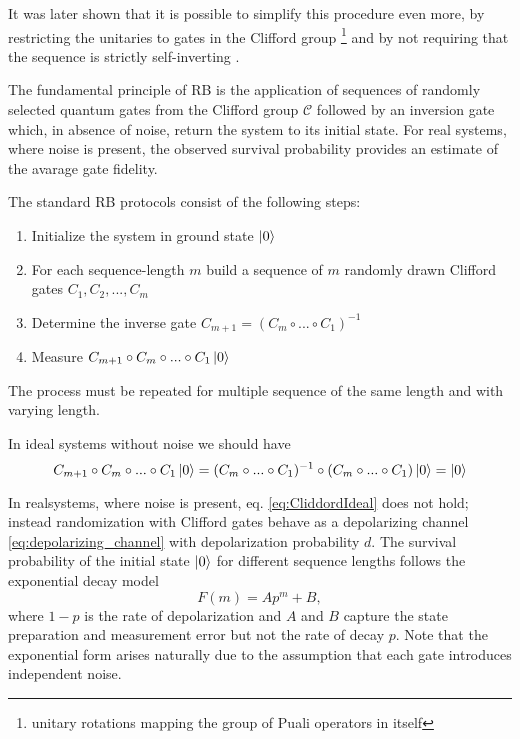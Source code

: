 It was later shown that it is possible to simplify this procedure even more, by restricting the unitaries to gates in the Clifford group \footnote{unitary rotations mapping the group of Puali operators in itself} and by not requiring that the sequence is strictly self-inverting \cite{knill_randomized_2008}.
\begin{comment}
    The Haar measure is crucial because it provides a unique, invariant way of selecting random elements from a group (in this case, unitary gates) that ensures the randomness is truly uniform and unbiased across the group's structure.
\end{comment}

The fundamental principle of RB is the application of sequences of randomly selected quantum gates from the Clifford group $\mathcal{C}$ followed by an inversion gate which, in absence of noise, return the system to its initial state. 
For real systems, where noise is present, the observed survival probability provides an estimate of the avarage gate fidelity.


The standard RB protocols consist of the following steps:\begin{enumerate}\label{routine:RB}
    \item Initialize the system in ground state $\ket{0}$
    \item For each sequence-length $m$ build a sequence of $m$ randomly drawn Clifford gates $C_1, C_2, ..., C_m$
    \item Determine the inverse gate $C_{m+1}=(C_m\circ...\circ C_1)^{-1}$
    \item Measure $C_{m+1}\circ C_m \circ ...\circ C_1 \ket{0}$
\end{enumerate}
The process must be repeated for multiple sequence of the same length and with varying length.

In ideal systems without noise we should have 
\begin{equation}\label{eq:CliffordIdeal}
    C_{m+1}\circ C_m \circ ...\circ C_1 \ket{0} = (C_m\circ...\circ C_1)^{-1}\circ(C_m\circ...\circ C_1)\ket{0} = \ket{0}
\end{equation}

In realsystems, where noise is present, eq. \ref{eq:CliddordIdeal} does not hold; instead randomization with Clifford gates behave as a depolarizing channel \ref{eq:depolarizing_channel} with depolarization probability $d$.
The survival probability of the initial state $\ket{0}$ for different sequence lengths follows the exponential decay model \begin{equation}
    F(m) = Ap^m +B,
\end{equation}
where $1-p$ is the rate of depolarization and $A$ and $B$ capture the state preparation and measurement error but not the rate of decay $p$. 
Note that the exponential form arises naturally due to the assumption that each gate introduces independent noise.

